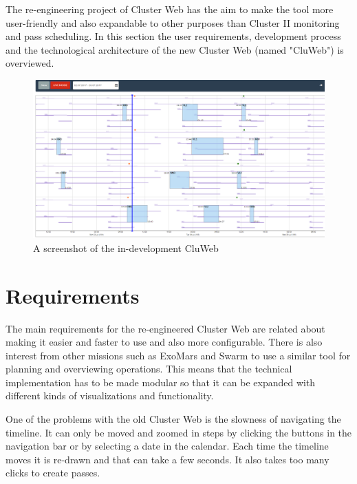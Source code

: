 
The re-engineering project of Cluster Web has the aim to make the tool more user-friendly and also expandable to other purposes than Cluster II monitoring and pass scheduling. In this section the user requirements, development process and the technological architecture of the new Cluster Web (named "CluWeb") is overviewed.

\begin{figure}[ht]
  \begin{center}
    \includegraphics*[width=1\textwidth]{cluweb_dev}
  \end{center}
  \caption{A screenshot of the in-development CluWeb}
  \label{fig:cluweb}
\end{figure}

\section{Requirements}
    The main requirements for the re-engineered Cluster Web are related about making it easier and faster to use and also more configurable. There is also interest from other missions such as ExoMars and Swarm to use a similar tool for planning and overviewing operations. This means that the technical implementation has to be made modular so that it can be expanded with different kinds of visualizations and functionality.

One of the problems with the old Cluster Web is the slowness of navigating the timeline. It can only be moved and zoomed in steps by clicking the buttons in the navigation bar or by selecting a date in the calendar. Each time the timeline moves it is re-drawn and that can take a few seconds. It also takes too many clicks to create passes.

